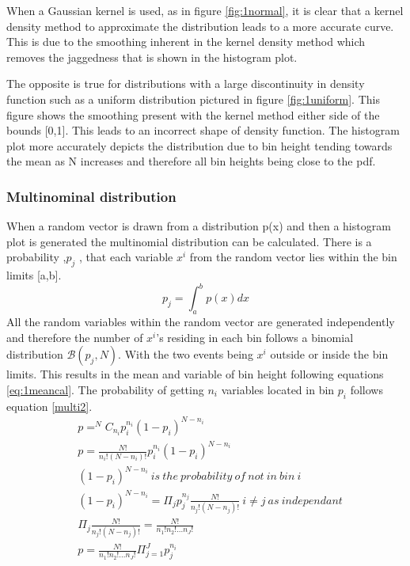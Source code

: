 \documentclass[twoside,twocolumn]{article}
\begin{document}
When a Gaussian kernel is used, as in figure \ref{fig:1normal}, it is clear that a kernel density method to approximate the distribution leads to a more accurate curve. This is due to the smoothing inherent in the kernel density method which removes the jaggedness that is shown in the histogram plot.

The opposite is true for distributions with a large discontinuity in density function such as a uniform distribution pictured in figure \ref{fig:1uniform}. This figure shows the smoothing present with the kernel method either side of the bounds [0,1]. This leads to an incorrect shape of density function. The histogram plot more accurately depicts the distribution due to bin height tending towards the mean as N increases and therefore all bin heights being close to the pdf.
\subsubsection{Multinominal distribution}
When a random vector is drawn from a distribution p(x) and then a histogram plot is generated the multinomial distribution can be calculated. There is a probability ,$p_j$ , that each variable $x^i$ from the random vector lies within the bin limits [a,b]. 
\begin{equation}
\label{multi1}
p_j = \int^{b}_{a}p(x)dx
\end{equation}
All the random variables within the random vector are generated independently and therefore the number of $x^i$'s residing in each bin follows a binomial distribution $\mathcal{B}(p_j,N)$. With the two events being $x^i$ outside or inside the bin limits.  This results in the mean and variable of bin height following equations \ref{eq:1meancal}. The probability of getting $n_i$ variables located in bin $p_i$ follows equation \ref{multi2}. 
\begin{equation}
\label{multi2}
\begin{split}
&p = ^NC_{n_i} p_i^{n_i}(1-p_i)^{N-n_i}\\
&p = \frac{N!}{n_i!(N-n_i)!} p_i^{n_i}(1-p_i)^{N-n_i}\\
&(1-p_i)^{N-n_i} \: is \: the \: probability \: of \: not \: in \: bin \: i\\
&(1-p_i)^{N-n_i} = \Pi_j p_j^{n_j} \frac{N!}{n_j!(N-n_j)!} \:i\neq j \: as \: independant\\
&\Pi_j \frac{N!}{n_j!(N-n_j)!} = \frac{N!}{n_1!n_2!...n_J!}\\
& p = \frac{N!}{n_1!n_2!...n_J!}\Pi_{j=1}^J p_j^{n_i}\\
\end{split}
\end{equation}
\end{document}
